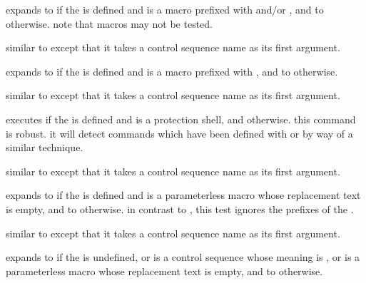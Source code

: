 \begin{ltxsyntax}

expands to  if the  is defined and is a macro prefixed with  and\slash or , and to  otherwise. note that  macros may not be tested.


similar to  except that it takes a control sequence name as its first argument.


expands to  if the  is defined and is a macro prefixed with , and to  otherwise.


similar to  except that it takes a control sequence name as its first argument.


executes  if the  is defined and is a \latex protection shell, and  otherwise. this command is robust. it will detect commands which have been defined with  or by way of a similar technique.


similar to  except that it takes a control sequence name as its first argument.


expands to  if the  is defined and is a parameterless macro whose replacement text is empty, and to  otherwise. in contrast to , this test ignores the prefixes of the .


similar to  except that it takes a control sequence name as its first argument.


expands to  if the  is undefined, or is a control sequence whose meaning is , or is  a parameterless macro whose replacement text is empty, and to  otherwise.


\end{ltxsyntax}
